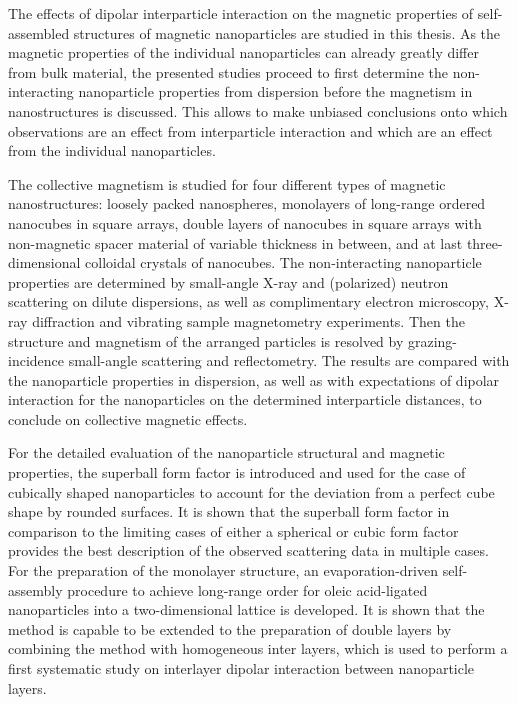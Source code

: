 \documentclass[\main/dresen_thesis.tex]{subfiles}
\begin{document}
  The effects of dipolar interparticle interaction on the magnetic properties of self-assembled structures of magnetic nanoparticles are studied in this thesis.
  As the magnetic properties of the individual nanoparticles can already greatly differ from bulk material, the presented studies proceed to first determine the non-interacting nanoparticle properties from dispersion before the magnetism in nanostructures is discussed.
  This allows to make unbiased conclusions onto which observations are an effect from interparticle interaction and which are an effect from the individual nanoparticles.

  The collective magnetism is studied for four different types of magnetic nanostructures: loosely packed nanospheres, monolayers of long-range ordered nanocubes in square arrays, double layers of nanocubes in square arrays with non-magnetic spacer material of variable thickness in between, and at last three-dimensional colloidal crystals of nanocubes.
  The non-interacting nanoparticle properties are determined by small-angle X-ray and (polarized) neutron scattering on dilute dispersions, as well as complimentary electron microscopy, X-ray diffraction and vibrating sample magnetometry experiments.
  Then the structure and magnetism of the arranged particles is resolved by grazing-incidence small-angle scattering and reflectometry.
  The results are compared with the nanoparticle properties in dispersion, as well as with expectations of dipolar interaction for the nanoparticles on the determined interparticle distances, to conclude on collective magnetic effects.

  For the detailed evaluation of the nanoparticle structural and magnetic properties, the superball form factor is introduced and used for the case of cubically shaped nanoparticles to account for the deviation from a perfect cube shape by rounded surfaces.
  It is shown that the superball form factor in comparison to the limiting cases of either a spherical or cubic form factor provides the best description of the observed scattering data in multiple cases.
  For the preparation of the monolayer structure, an evaporation-driven self-assembly procedure to achieve long-range order for oleic acid-ligated nanoparticles into a two-dimensional lattice is developed.
  It is shown that the method is capable to be extended to the preparation of double layers by combining the method with homogeneous inter layers, which is used to perform a first systematic study on interlayer dipolar interaction between nanoparticle layers.
\end{document}
